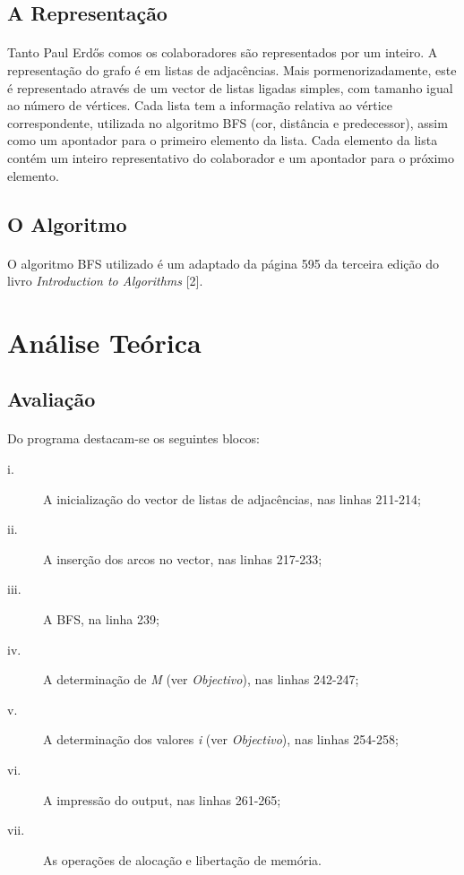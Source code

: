 \documentclass[12pt, a4paper, margin=3cm]{article}
\begin{document}
\subsection{A Representação}
\paragraph{}
Tanto Paul Erdős comos os colaboradores são representados por um inteiro.
A representação do grafo é em listas de adjacências. Mais pormenorizadamente,
este é representado através de um vector de listas ligadas simples, com tamanho
igual ao número de  vértices. Cada lista tem a informação relativa ao vértice
correspondente, utilizada no algoritmo BFS (cor, distância e predecessor), assim
como um apontador para o primeiro elemento da lista. Cada elemento da lista
contém um inteiro representativo do colaborador e um apontador para o próximo
elemento.

\subsection{O Algoritmo}
\paragraph{}
O algoritmo BFS utilizado é um adaptado da página 595 da terceira edição do
livro \textit{Introduction to Algorithms} [2].


\section{Análise Teórica}
\subsection{Avaliação}
\paragraph{}
Do programa destacam-se os seguintes blocos:

\begin{description}
    \item[i.] A inicialização do vector de listas de adjacências, nas linhas
        211-214;
    \item[ii.] A inserção dos arcos no vector, nas linhas 217-233;
    \item[iii.] A BFS, na linha 239;
    \item[iv.] A determinação de \textit{M} (ver \textit{Objectivo}), nas linhas
        242-247;
    \item[v.] A determinação dos valores \textit{i} (ver \textit{Objectivo}), nas linhas
        254-258;
    \item[vi.] A impressão do output, nas linhas 261-265;
    \item[vii.] As operações de alocação e libertação de memória.
\end{description}
\end{document}
